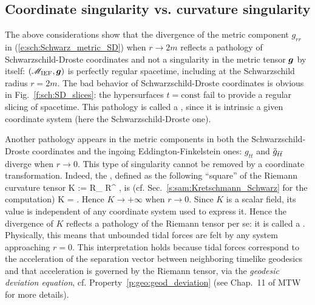 \subsection{Coordinate singularity vs. curvature singularity}
\label{s:sch:singularities}

The above considerations show that the divergence of the metric
component $g_{rr}$ in (\ref{e:sch:Schwarz_metric_SD}) when $r\rightarrow 2m$
reflects a pathology of Schwarzschild-Droste coordinates and not a singularity
in the metric tensor $\bm{g}$ by itself: $(\mathscr{M}_{\rm IEF}, \bm{g})$ is perfectly
regular spacetime, including at the Schwarzschild radius $r=2m$.
The bad behavior of Schwarzschild-Droste coordinates is obvious in Fig.~\ref{f:sch:SD_slices}: the hypersurfaces
$t=\mathrm{const}$ fail to provide a regular slicing of spacetime.
This pathology is called a
, since it is intrinsic a given coordinate system
(here the Schwarzschild-Droste one).

Another pathology appears in the metric components in both the Schwarzschild-Droste coordinates and the ingoing Eddington-Finkelstein ones: $g_{tt}$ and $\tilde{g}_{{\tilde t}{\tilde t}}$ diverge when $r\rightarrow 0$. This type of singularity
cannot be removed by a coordinate transformation. Indeed, the
, defined as the
following ``square'' of the Riemann curvature tensor
\be \label{e:sch:def_Kretschmann}
    K := R_{\mu\nu\rho\sigma} R^{\mu\nu\rho\sigma} ,
\ee
is (cf. Sec.~\ref{s:sam:Kretschmann_Schwarz} for the computation)
\be \label{e:sch:value_Kretschmann}
    K =  .
\ee
Hence $K\rightarrow +\infty$ when $r\rightarrow 0$. Since $K$ is a scalar
field, its value is independent of any coordinate system used to express it.
Hence the divergence of $K$ reflects a pathology of the Riemann tensor
per se: it is called a
.
Physically, this means that unbounded tidal forces are felt by any system
approaching $r=0$. This interpretation holds because
tidal forces correspond to
the acceleration of the separation vector between
neighboring timelike geodesics and that acceleration is
governed by the Riemann tensor,
via the \emph{geodesic deviation equation}, cf. Property~\ref{p:geo:geod_deviation} (see Chap.~11 of MTW \cite{MisneTW73} for more details).


